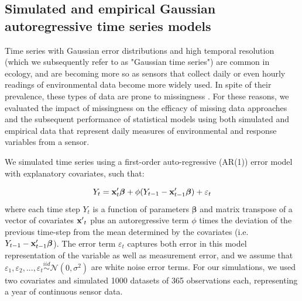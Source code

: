 \documentclass{article}
\begin{document}
\subsection*{Simulated and empirical Gaussian autoregressive time series models}

Time series with Gaussian error distributions and high temporal resolution (which we subsequently refer to as "Gaussian time series") are common in ecology, and are becoming more so as sensors that collect daily or even hourly readings of environmental data become more widely used. In spite of their prevalence, these types of data are prone to missingness \citep{chen2013ecological}. For these reasons, we evaluated the impact of missingness on the efficacy of missing data approaches and the subsequent performance of statistical models using both simulated and empirical data that represent daily measures of environmental and response variables from a sensor. 

We simulated time series using a first-order auto-regressive (AR(1)) error model with explanatory covariates, such that:

\begin{equation}
    Y_t = {\bf x}_t'{\bm \beta} + \phi (Y_{t-1} - {\bf x}_{t-1}'{\bm \beta}) + \varepsilon_t
\label{eq:ar1}
\end{equation}
where each time step \(Y_t\) is a function of parameters \(\bm \beta\) and matrix transpose of a vector of covariates \({\bf x'}_t\)%
 plus an autoregressive term \(\phi\) times the deviation of the previous time-step from the mean determined by the covariates (i.e. $Y_{t-1} - {\bf x}_{t-1}'{\bm \beta}$). The error term \(\varepsilon_t\) captures both error in this model representation of the variable as well as measurement error, and we assume that $\varepsilon_1, \varepsilon_2,..., \varepsilon_t \overset{iid}{\sim} \mathcal{N}(0, \sigma^2)$ are white noise error terms. For our simulations, we used two covariates and simulated 1000 datasets of 365 observations each, representing a year of continuous sensor data. %
\end{document}
